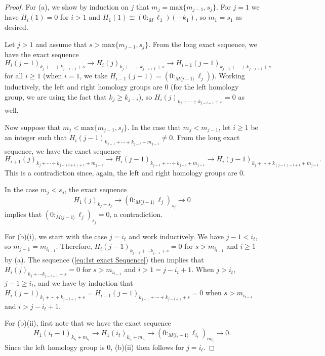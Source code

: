 \documentclass[10pt,a4paper]{amsart}
\begin{document}
\begin{proof}
     For (a), we show by induction on $j$ that $m_j=\textrm{max}\{m_{j-1},s_j\}$. For $j=1$ we have $H_i(1)=0$ for $i>1$ and $H_1(1) \cong (0:_M \ell_1)(-k_1)$, so $m_1 = s_1$ as desired.

    Let $j>1$ and assume that $s>\textrm{max}\{m_{j-1},s_j \}$. From the long exact sequence, we have the exact sequence
    \begin{equation}\label{eq:1st exact Sequence}
        H_i(j-1)_{k_j+\cdots + k_{j-i+1} + s} \longrightarrow H_i(j)_{k_j+\cdots + k_{j-i+1} + s} \longrightarrow H_{i-1}(j-1)_{k_{j-1}+\cdots + k_{j-i+1} + s}
    \end{equation}
    for all $i\geq 1$ (when $i=1$, we take $H_{i-1}(j-1) = (0:_{M\langle j-1 \rangle} \ell_j)$). Working inductively, the left and right homology groups are $0$ (for the left homology group, we are using the fact that $k_j\geq k_{j-i}$), so $H_i(j)_{k_j+\cdots + k_{j-i+1} + s}=0$ as well. 

    Now suppose that $m_j < \textrm{max}\{m_{j-1},s_j\}$. In the case that $m_j < m_{j-1}$, let $i\geq 1$ be an integer such that $H_i(j-1)_{k_{j-1}+\cdots+k_{j-i}+m_{j-1}}\neq 0$. From the long exact sequence, we have the exact sequence
    \[
    H_{i+1}(j)_{k_{j}+\cdots+k_{j-(i+1)+1}+m_{j-1}} \longrightarrow H_i(j-1)_{k_{j-1}+\cdots+k_{j-i}+m_{j-1}}\longrightarrow H_i(j-1)_{k_{j}+\cdots+k_{(j-1)-i+1}+m_{j-1}}.
    \]
    This is a contradiction since, again, the left and right homology groups are $0$.

    In the case $m_j<s_j$, the exact sequence
    \[
    H_1(j)_{k_j+s_j} \longrightarrow (0:_{M\langle j-1 \rangle} \ell_j)_{s_j} \longrightarrow 0
    \]
    implies that $(0:_{M\langle j-1 \rangle} \ell_j)_{s_j}=0$, a contradiction.

    For (b)(i), we start with the case $j=i_t$ and work inductively. We have $j-1 < i_t$, so $m_{j-1} = m_{i_{t-1}}$. Therefore, $H_i(j-1)_{k_{j-1} + \cdots k_{j-i}+s}=0$ for $s>m_{i_{t-1}}$ and $i\geq 1$ by (a). The sequence (\ref{eq:1st exact Sequence}) then implies that $H_i(j)_{k_j+\cdots k_{j-i+1} + s}=0$ for $s>m_{i_{t-1}}$ and $i>1=j-i_t+1$. When $j>i_t$, $j-1\geq i_t$, and we have by induction that $H_i(j-1)_{k_{j} + \cdots + k_{j-i+1}+s}=H_{i-1}(j-1)_{k_{j-1} + \cdots + k_{j-i+1}+s}=0$ when $s>m_{i_{t-1}}$ and $i>j-i_t+1$.

    For (b)(ii), first note that we have the exact sequence
    \[
    H_1(i_t-1)_{k_{i_t}+m_{i_t}} \longrightarrow H_1(i_t)_{k_{i_t}+m_{i_t}} \longrightarrow (0:_{M\langle i_t-1 \rangle} \ell_{i_t})_{m_{i_t}}\longrightarrow 0.
    \]
    Since the left homology group is $0$, (b)(ii) then follows for $j=i_t$.


\end{proof}
\end{document}
